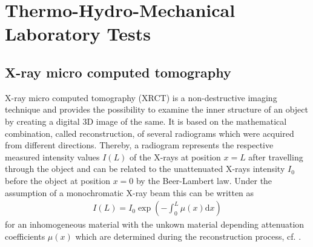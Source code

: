 \section{Thermo-Hydro-Mechanical Laboratory Tests}
\subsection{X-ray micro computed tomography}
X-ray micro computed tomography ({\textmu}XRCT) is a non-destructive imaging technique and provides the possibility to examine the inner structure of an object by creating a digital 3D image of the same. It is based on the mathematical combination, called reconstruction, of several radiograms which were acquired from different directions. Thereby, a radiogram represents the respective measured intensity values $I(L)$ of the X-rays at position $x = L$ after travelling through the object and can be related to the unattenuated X-rays intensity $I_0$ before the object at position $x = 0$ by the Beer-Lambert law. Under the assumption of a monochromatic X-ray beam this can be written as 
\begin{align*}
I(L) = I_0 \exp\left(-\int_0^L \mu(x) \mathrm{d}x \right)
\end{align*}
for an inhomogeneous material with the unkown material depending attenuation coefficients $\mu(x)$ which are determined during the reconstruction process, cf. \cite{Carmignato2018}.

